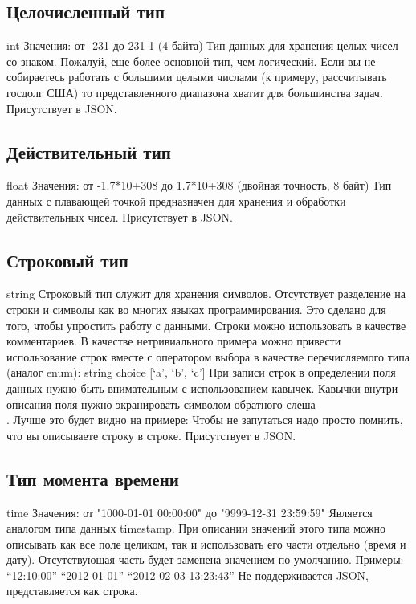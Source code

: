 {{\subsection{Целочисленный тип}
int
Значения: от -231 до 231-1 (4 байта)
Тип данных для хранения целых чисел со знаком. Пожалуй, еще более основной тип, чем логический. Если вы не собираетесь работать с большими целыми числами (к примеру, рассчитывать госдолг США) то представленного диапазона хватит для большинства задач.
Присутствует в JSON.

\subsection{Действительный тип}
float
Значения: от -1.7*10+308 до 1.7*10+308 (двойная точность, 8 байт)
Тип данных с плавающей точкой предназначен для хранения и обработки действительных чисел.
Присутствует в JSON.

\subsection{Строковый тип}
string
Строковый тип служит для хранения символов. Отсутствует разделение на строки и символы как во многих языках программирования. Это сделано для того, чтобы упростить работу с данными. Строки можно использовать в качестве комментариев. В качестве нетривиального примера можно привести использование строк вместе с оператором выбора в качестве перечисляемого типа (аналог enum):
        string choice [‘a’, ‘b’, ‘c’]
При записи строк в определении поля данных нужно быть внимательным с использованием кавычек. Кавычки внутри описания поля нужно экранировать символом обратного слеша \\. Лучше это будет видно на примере:
Чтобы не запутаться надо просто помнить, что вы описываете строку в строке.
Присутствует в JSON.

\subsection{Тип момента времени}
time
Значения: от "1000-01-01 00:00:00" до "9999-12-31 23:59:59"
Является аналогом типа данных timestamp. При описании значений этого типа можно описывать как все поле целиком, так и использовать его части отдельно (время и дату). Отсутствующая часть будет заменена значением по умолчанию. Примеры:
        “12:10:00”
        “2012-01-01”
        “2012-02-03 13:23:43”
Не поддерживается JSON, представляется как строка.

}}
